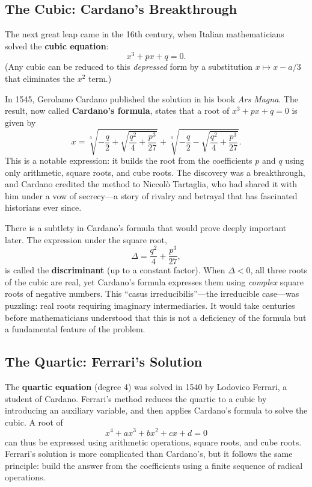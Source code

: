 \subsection{The Cubic: Cardano's Breakthrough}

The next great leap came in the 16th century, when Italian mathematicians solved the \textbf{cubic equation}:
\[
    x^3 + px + q = 0.
\]
(Any cubic can be reduced to this \emph{depressed} form by a substitution $x \mapsto x - a/3$ that eliminates the $x^2$ term.)

In 1545, Gerolamo Cardano published the solution in his book \emph{Ars Magna}. The result, now called \textbf{Cardano's formula}, states that a root of $x^3 + px + q = 0$ is given by
\[
    x = \sqrt[3]{-\frac{q}{2} + \sqrt{\frac{q^2}{4} + \frac{p^3}{27}}} + \sqrt[3]{-\frac{q}{2} - \sqrt{\frac{q^2}{4} + \frac{p^3}{27}}}.
\]
This is a notable expression: it builds the root from the coefficients $p$ and $q$ using only arithmetic, square roots, and cube roots. The discovery was a breakthrough, and Cardano credited the method to Niccol\`o Tartaglia, who had shared it with him under a vow of secrecy---a story of rivalry and betrayal that has fascinated historians ever since.

There is a subtlety in Cardano's formula that would prove deeply important later. The expression under the square root,
\[
    \Delta = \frac{q^2}{4} + \frac{p^3}{27},
\]
is called the \textbf{discriminant} (up to a constant factor). When $\Delta < 0$, all three roots of the cubic are real, yet Cardano's formula expresses them using \emph{complex} square roots of negative numbers. This ``casus irreducibilis''---the irreducible case---was puzzling: real roots requiring imaginary intermediaries. It would take centuries before mathematicians understood that this is not a deficiency of the formula but a fundamental feature of the problem.

\subsection{The Quartic: Ferrari's Solution}

The \textbf{quartic equation} (degree 4) was solved in 1540 by Lodovico Ferrari, a student of Cardano. Ferrari's method reduces the quartic to a cubic by introducing an auxiliary variable, and then applies Cardano's formula to solve the cubic. A root of
\[
    x^4 + ax^3 + bx^2 + cx + d = 0
\]
can thus be expressed using arithmetic operations, square roots, and cube roots. Ferrari's solution is more complicated than Cardano's, but it follows the same principle: build the answer from the coefficients using a finite sequence of radical operations.

